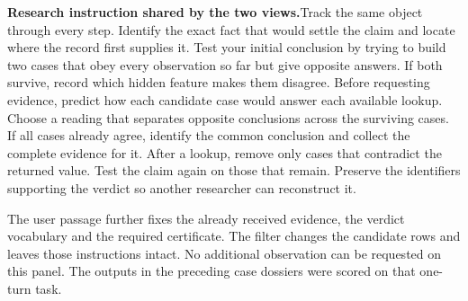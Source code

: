 \documentclass[12pt,letterpaper]{article}
\newcommand{\reading}[2]{\par\smallskip\textsf{\color{accent}\bfseries #1}\enspace #2\par}
\begin{document}
\reading{Research instruction shared by the two views.}{Track the same object through every step. Identify the exact fact that would settle the claim and locate where the record first supplies it. Test your initial conclusion by trying to build two cases that obey every observation so far but give opposite answers. If both survive, record which hidden feature makes them disagree. Before requesting evidence, predict how each candidate case would answer each available lookup. Choose a reading that separates opposite conclusions across the surviving cases. If all cases already agree, identify the common conclusion and collect the complete evidence for it. After a lookup, remove only cases that contradict the returned value. Test the claim again on those that remain. Preserve the identifiers supporting the verdict so another researcher can reconstruct it.}

The user passage further fixes the already received evidence, the verdict vocabulary and the required certificate. The filter changes the candidate rows and leaves those instructions intact. No additional observation can be requested on this panel. The outputs in the preceding case dossiers were scored on that one-turn task.
\end{document}
